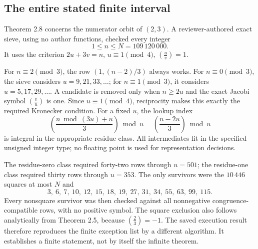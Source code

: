 \documentclass[10pt]{article}
\begin{document}
\subsection*{The entire stated finite interval}
Theorem 2.8 concerns the numerator orbit of \((2,3)\). A reviewer-authored exact sieve, using no author functions, checked every integer \[1\leq n\leq N=109\,120\,000.\] It uses the criterion \(2u+3v=n\), \(u\equiv1\pmod4\), \(\left(\frac{u}{v}\right)=1\).\par
For \(n\equiv2\pmod3\), the row \((1,(n-2)/3)\) always works. For \(n\equiv0\pmod3\), the sieve considers \(u=9,21,33,\ldots\); for \(n\equiv1\pmod3\), it considers \(u=5,17,29,\ldots\). A candidate is removed only when \(n\geq2u\) and the exact Jacobi symbol \(\left(\frac{v}{u}\right)\) is one. Since \(u\equiv1\pmod4\), reciprocity makes this exactly the required Kronecker condition. For a fixed \(u\), the lookup index \[\left(\frac{n\bmod(3u)+u}{3}\right)\bmod u
       =\left(\frac{n-2u}{3}\right)\bmod u\] is integral in the appropriate residue class. All intermediates fit in the specified unsigned integer type; no floating point is used for representation decisions.\par
The residue-zero class required forty-two rows through \(u=501\); the residue-one class required thirty rows through \(u=353\). The only survivors were the \(10\,446\) squares at most \(N\) and \[3,\ 6,\ 7,\ 10,\ 12,\ 15,\ 18,\ 19,\ 27,\ 31,\ 34,\ 55,\ 63,\ 99,\ 115.
 \tag{5.1}\] Every nonsquare survivor was then checked against all nonnegative congruence-compatible rows, with no positive symbol. The square exclusion also follows analytically from Theorem 2.5, because \(\left(\frac{2}{3}\right)=-1\). The saved execution result therefore reproduces the finite exception list by a different algorithm. It establishes a finite statement, not by itself the infinite theorem.\par
\end{document}
